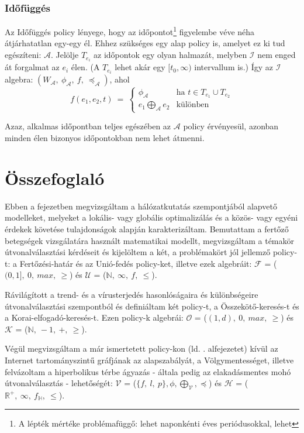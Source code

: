       \subsubsection{Időfüggés}
      Az Időfüggés policy lényege, hogy az időpontot\footnote{A lépték mértéke problémafüggő: lehet naponkénti éves periódusokkal, lehet } figyelembe véve néha átjárhatatlan egy-egy él. Ehhez szükséges egy alap policy is, amelyet ez ki tud egészíteni: $\mathcal{A}$. Jelölje $T_{e_i}$ az időpontok egy olyan halmazát, melyben $\mathcal{I}$ nem enged át forgalmat az $e_i$ élen. (A $T_{e_i}$ lehet akár egy $[t_0, \infty)$ intervallum is.) Így az $\mathcal{I}$ algebra: $(W_{\mathcal{A}},~\phi_{\mathcal{A}},~f,~\preceq_{\mathcal{A}})$, ahol
      $$f(e_1,e_2,t)~=~
      \begin{cases}
        \phi_{\mathcal{A}} & \text{ha } t \in T_{e_1} \cup T_{e_2}\\
        e_1 \bigoplus_{\mathcal{A}} e_2 & \text{különben}
      \end{cases}$$

      Azaz, alkalmas időpontban teljes egészében az $\mathcal{A}$ policy érvényesül, azonban minden élen bizonyos időpontokban nem lehet átmenni.\\

  \section{Összefoglaló}
  Ebben a fejezetben megvizsgáltam a hálózatkutatás szempontjából alapvető modelleket, melyeket a lokális- vagy globális optimalizálás és a közös- vagy egyéni érdekek követése tulajdonságok alapján karakterizáltam. Bemutattam a fertőző betegségek vizsgálatára használt matematikai modellt, megvizsgáltam a témakör útvonalválasztási kérdéseit és kijelöltem a két, a problémakört jól jellemző policy-t: a Fertőzési-határ és az Unió-fedés policy-ket, illetve ezek algebráit: $\mathcal{F}$ = ($(0,1],~0,~max,~\geq$) és $\mathcal{U}$ = ($\mathbb{N},~\infty,~f,~\leq$).

  Rávilágított a trend- és a vírusterjedés hasonlóságaira és különbségeire útvonalválasztási szempontból és definiáltam két policy-t, a Összekötő-keresés-t és a Korai-elfogadó-keresés-t. Ezen policy-k algebrái: $\mathcal{O}$ = ($(1,d),~0,~max,~\geq$) és $\mathcal{K}$ = ($\mathbb{N},~-1,~+,~\geq$).

  Végül megvizsgáltam a már ismertetett policy-kon (ld. . alfejezetet) kívül az Internet tartományszintű gráfjának az alapszabályát, a Völgymentességet, illetve felvázoltam a hiperbolikus térbe ágyazás - általa pedig az elakadásmentes mohó útvonalválasztás - lehetőségét: $\mathcal{V}$ = ($\{f,~l,~p\},\phi,\bigoplus_{\mathcal{V}},\preceq$) és $\mathcal{H}$ = ($\mathbb{R}^{+},~\infty,~f_{\mathbb{H}},~\leq$).
